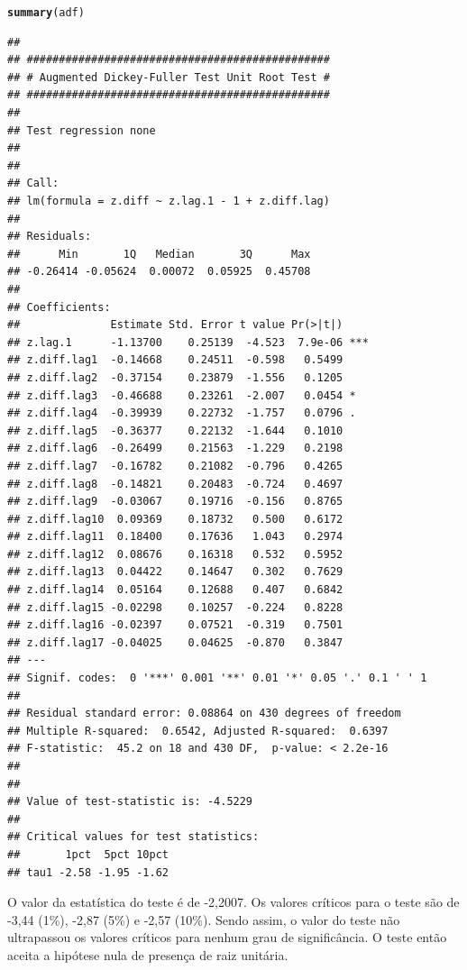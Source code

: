 \documentclass{article}\usepackage[]{graphicx}\usepackage[]{color}
\makeatletter
\newcommand{\hlstd}[1]{\textcolor[rgb]{0.345,0.345,0.345}{#1}}%
\newcommand{\hlkwd}[1]{\textcolor[rgb]{0.737,0.353,0.396}{\textbf{#1}}}%
\newenvironment{kframe}{%
 \def\at@end@of@kframe{}%
 \ifinner\ifhmode%
  \def\at@end@of@kframe{\end{minipage}}%
  \begin{minipage}{\columnwidth}%
 \fi\fi%
 \def\FrameCommand##1{\hskip\@totalleftmargin \hskip-\fboxsep
 \colorbox{shadecolor}{##1}\hskip-\fboxsep
     \hskip-\linewidth \hskip-\@totalleftmargin \hskip\columnwidth}%
 \MakeFramed {\advance\hsize-\width
   \@totalleftmargin\z@ \linewidth\hsize
   \@setminipage}}%
 {\par\unskip\endMakeFramed%
 \at@end@of@kframe}
\newenvironment{knitrout}{}{} %
\makeatother
\begin{document}
\begin{knitrout}
\color{fgcolor}\begin{kframe}
\begin{alltt}
\hlkwd{summary}\hlstd{(adf)}
\end{alltt}
\begin{verbatim}
## 
## ############################################### 
## # Augmented Dickey-Fuller Test Unit Root Test # 
## ############################################### 
## 
## Test regression none 
## 
## 
## Call:
## lm(formula = z.diff ~ z.lag.1 - 1 + z.diff.lag)
## 
## Residuals:
##      Min       1Q   Median       3Q      Max 
## -0.26414 -0.05624  0.00072  0.05925  0.45708 
## 
## Coefficients:
##              Estimate Std. Error t value Pr(>|t|)    
## z.lag.1      -1.13700    0.25139  -4.523  7.9e-06 ***
## z.diff.lag1  -0.14668    0.24511  -0.598   0.5499    
## z.diff.lag2  -0.37154    0.23879  -1.556   0.1205    
## z.diff.lag3  -0.46688    0.23261  -2.007   0.0454 *  
## z.diff.lag4  -0.39939    0.22732  -1.757   0.0796 .  
## z.diff.lag5  -0.36377    0.22132  -1.644   0.1010    
## z.diff.lag6  -0.26499    0.21563  -1.229   0.2198    
## z.diff.lag7  -0.16782    0.21082  -0.796   0.4265    
## z.diff.lag8  -0.14821    0.20483  -0.724   0.4697    
## z.diff.lag9  -0.03067    0.19716  -0.156   0.8765    
## z.diff.lag10  0.09369    0.18732   0.500   0.6172    
## z.diff.lag11  0.18400    0.17636   1.043   0.2974    
## z.diff.lag12  0.08676    0.16318   0.532   0.5952    
## z.diff.lag13  0.04422    0.14647   0.302   0.7629    
## z.diff.lag14  0.05164    0.12688   0.407   0.6842    
## z.diff.lag15 -0.02298    0.10257  -0.224   0.8228    
## z.diff.lag16 -0.02397    0.07521  -0.319   0.7501    
## z.diff.lag17 -0.04025    0.04625  -0.870   0.3847    
## ---
## Signif. codes:  0 '***' 0.001 '**' 0.01 '*' 0.05 '.' 0.1 ' ' 1
## 
## Residual standard error: 0.08864 on 430 degrees of freedom
## Multiple R-squared:  0.6542,	Adjusted R-squared:  0.6397 
## F-statistic:  45.2 on 18 and 430 DF,  p-value: < 2.2e-16
## 
## 
## Value of test-statistic is: -4.5229 
## 
## Critical values for test statistics: 
##       1pct  5pct 10pct
## tau1 -2.58 -1.95 -1.62
\end{verbatim}
\end{kframe}
\end{knitrout}

            O valor da estatística do teste é de -2,2007. Os valores críticos para o teste são de -3,44 (1\%), -2,87 (5\%) e -2,57 (10\%). Sendo assim, o valor do teste não ultrapassou os valores críticos para nenhum grau de significância. O teste então aceita a hipótese nula de presença de raiz unitária.
\end{document}
